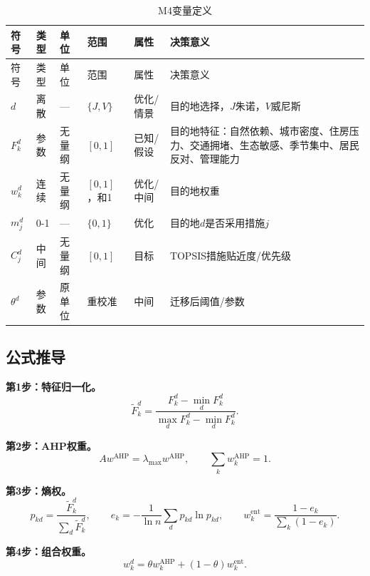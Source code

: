 \documentclass[UTF8,a4paper,12pt]{ctexart}
\begin{document}
\begin{longtable}{@{}p{1.5cm}p{1.3cm}p{1.2cm}p{2.2cm}p{1.2cm}p{5.1cm}@{}}
\caption{M4变量定义}\\
\toprule
符号 & 类型 & 单位 & 范围 & 属性 & 决策意义\\
\midrule
\endfirsthead
\toprule
符号 & 类型 & 单位 & 范围 & 属性 & 决策意义\\
\midrule
\endhead
\(d\) & 离散 & — & \(\{J,V\}\) & 优化/情景 & 目的地选择，\(J\)朱诺，\(V\)威尼斯\\
\(F_k^d\) & 参数 & 无量纲 & \([0,1]\) & 已知/假设 & 目的地特征：自然依赖、城市密度、住房压力、交通拥堵、生态敏感、季节集中、居民反对、管理能力\\
\(w_k^d\) & 连续 & 无量纲 & \([0,1]\)，和1 & 优化/中间 & 目的地权重\\
\(m_j^d\) & 0-1 & — & \(\{0,1\}\) & 优化 & 目的地\(d\)是否采用措施\(j\)\\
\(C_j^d\) & 中间 & 无量纲 & \([0,1]\) & 目标 & TOPSIS措施贴近度/优先级\\
\(\theta^d\) & 参数 & 原单位 & 重校准 & 中间 & 迁移后阈值/参数\\
\bottomrule
\end{longtable}

\subsection{公式推导}

\textbf{第1步：特征归一化。}
\begin{equation}\tag{M4-1}
\tilde F_k^d=\frac{F_k^d-\min_dF_k^d}{\max_dF_k^d-\min_dF_k^d}.
\end{equation}

\textbf{第2步：AHP权重。}
\begin{equation}\tag{M4-2}
A w^{\mathrm{AHP}}=\lambda_{\max}w^{\mathrm{AHP}},\qquad \sum_kw_k^{\mathrm{AHP}}=1.
\end{equation}

\textbf{第3步：熵权。}
\begin{equation}\tag{M4-3}
p_{kd}=\frac{\tilde F_k^d}{\sum_d\tilde F_k^d},\qquad e_k=-\frac{1}{\ln n}\sum_dp_{kd}\ln p_{kd},\qquad w_k^{\mathrm{ent}}=\frac{1-e_k}{\sum_k(1-e_k)}.
\end{equation}

\textbf{第4步：组合权重。}
\begin{equation}\tag{M4-4}
w_k^d=\theta w_k^{\mathrm{AHP}}+(1-\theta)w_k^{\mathrm{ent}}.
\end{equation}
\end{document}
